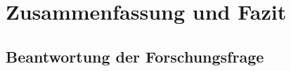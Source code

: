\chapter{Zusammenfassung und Fazit}
\label{chap:fazit}


\section{Beantwortung der Forschungsfrage}
\label{sec:beantwortung}


\label{subsec:thesis_praktikabilität}

\label{subsubsec:tech_feasible}

\label{subsubsec:effectiveness_summary}

\label{subsubsec:limitations_summary}

